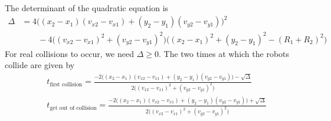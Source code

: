 The determinant of the quadratic equation is
\begin{equation*}
    \boxed{
        \begin{aligned}
            \Delta
             & =
            4\big((x_2 - x_1)(v_{x2} - v_{x1}) + (y_2 - y_1)(v_{y2} - v_{y1})\big)^2
            \\ & \qquad
            - 4\big((v_{x2} - v_{x1})^2 + (v_{y2} - v_{y1})^2\big)\big((x_2 - x_1)^2 + (y_2 - y_1)^2 - (R_1 + R_2)^2\big)
        \end{aligned}
    }
\end{equation*}
For real collisions to occur, we need \( \Delta \geq 0 \).
The two times at which the robots collide are given by
\begin{align*}
     &
    \boxed{
        t_{\text{first collision}}
        =
        \frac{-2\big((x_2 - x_1)(v_{x2} - v_{x1}) + (y_2 - y_1)(v_{y2} - v_{y1})\big) - \sqrt{\Delta}}{2\big((v_{x2} - v_{x1})^2 + (v_{y2} - v_{y1})^2\big)}
    }
    \\ &
    \boxed{
        t_{\text{get out of collision}}
        =
        \frac{-2\big((x_2 - x_1)(v_{x2} - v_{x1}) + (y_2 - y_1)(v_{y2} - v_{y1})\big) + \sqrt{\Delta}}{2\big((v_{x2} - v_{x1})^2 + (v_{y2} - v_{y1})^2\big)}
    }
\end{align*}
